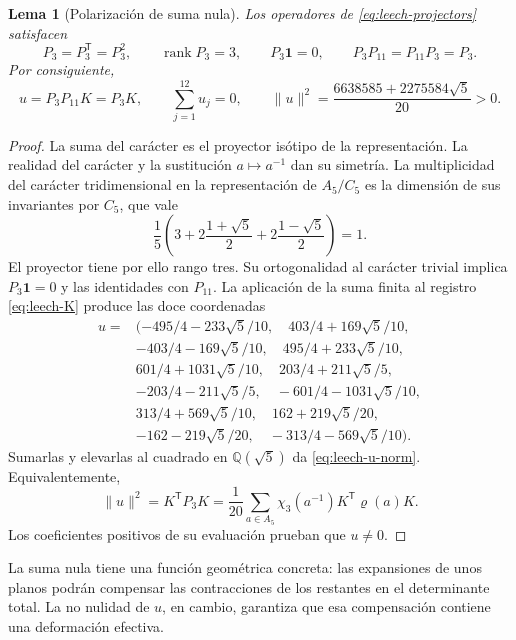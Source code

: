 \documentclass[a4paper,10pt]{article}
\newtheorem{lemma}[theorem]{Lema}
\theoremstyle{definition}\newtheorem{definition}[theorem]{Definición}
\theoremstyle{remark}\newtheorem{remark}[theorem]{Observación}
\numberwithin{equation}{section}
\begin{document}
\begin{lemma}[Polarización de suma nula]
\label{lem:leech-u}
Los operadores de \eqref{eq:leech-projectors} satisfacen
\[
 P_3=P_3^{\mathsf T}=P_3^2,\qquad
 \operatorname{rank}P_3=3,\qquad P_3\mathbf1=0,\qquad
 P_3P_{11}=P_{11}P_3=P_3.
\]
Por consiguiente,
\begin{equation}
 u=P_3P_{11}K=P_3K,\qquad
 \sum_{j=1}^{12}u_j=0,\qquad
 \|u\|^2=\frac{6638585+2275584\sqrt5}{20}>0.
 \label{eq:leech-u-norm}
\end{equation}
\end{lemma}
\begin{proof}
La suma del carácter es el proyector isótipo de la representación.
La realidad del carácter y la sustitución \(a\mapsto a^{-1}\)
dan su simetría. La multiplicidad del carácter tridimensional en la
representación de \(A_5/C_5\) es la dimensión de sus invariantes por
\(C_5\), que vale
\[
 \frac15\left(
 3+2\frac{1+\sqrt5}{2}+2\frac{1-\sqrt5}{2}
 \right)=1.
\]
El proyector tiene por ello rango tres. Su ortogonalidad al carácter
trivial implica \(P_3\mathbf1=0\) y las identidades con \(P_{11}\).
La aplicación de la suma finita al registro
\eqref{eq:leech-K} produce las doce coordenadas
\begin{equation}
\begin{aligned}
u={}&(-495/4-233\sqrt5/10,\quad403/4+169\sqrt5/10,\\
&-403/4-169\sqrt5/10,\quad495/4+233\sqrt5/10,\\
&601/4+1031\sqrt5/10,\quad203/4+211\sqrt5/5,\\
&-203/4-211\sqrt5/5,\quad-601/4-1031\sqrt5/10,\\
&313/4+569\sqrt5/10,\quad162+219\sqrt5/20,\\
&-162-219\sqrt5/20,\quad-313/4-569\sqrt5/10).
\end{aligned}
\label{eq:leech-u-coordinates}
\end{equation}
Sumarlas y elevarlas al cuadrado en \(\mathbb Q(\sqrt5)\) da
\eqref{eq:leech-u-norm}. Equivalentemente,
\[
 \|u\|^2=K^{\mathsf T}P_3K
 =\frac1{20}\sum_{a\in A_5}
          \chi_3(a^{-1})K^{\mathsf T}\varrho(a)K.
\]
Los coeficientes positivos de su evaluación prueban que \(u\ne0\).
\end{proof}

La suma nula tiene una función geométrica concreta: las expansiones de
unos planos podrán compensar las contracciones de los restantes en el
determinante total. La no nulidad de \(u\), en cambio, garantiza que esa
compensación contiene una deformación efectiva.
\end{document}

